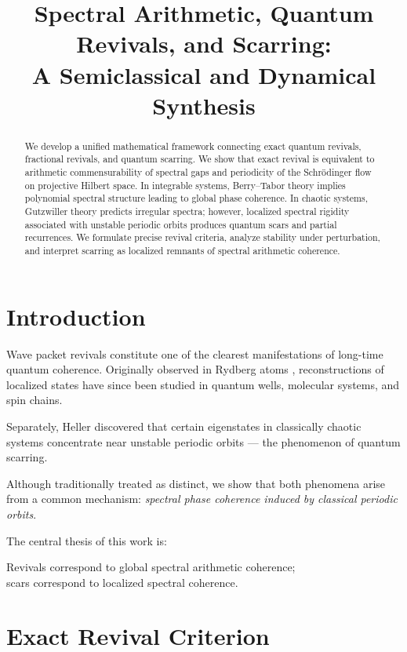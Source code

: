 \documentclass[11pt]{article}
\title{Spectral Arithmetic, Quantum Revivals, and Scarring:\\
A Semiclassical and Dynamical Synthesis}
\author{}
\date{}
\begin{document}
\maketitle

\begin{abstract}
We develop a unified mathematical framework connecting exact quantum revivals,
fractional revivals, and quantum scarring. 
We show that exact revival is equivalent to arithmetic commensurability of spectral gaps and periodicity of the Schr\"odinger flow on projective Hilbert space.
In integrable systems, Berry--Tabor theory implies polynomial spectral structure leading to global phase coherence.
In chaotic systems, Gutzwiller theory predicts irregular spectra; however, localized spectral rigidity associated with unstable periodic orbits produces quantum scars and partial recurrences.
We formulate precise revival criteria, analyze stability under perturbation,
and interpret scarring as localized remnants of spectral arithmetic coherence.
\end{abstract}

\tableofcontents

\section{Introduction}

Wave packet revivals constitute one of the clearest manifestations of long-time quantum coherence.
Originally observed in Rydberg atoms \cite{Eberly1980},
reconstructions of localized states have since been studied in quantum wells, molecular systems, and spin chains.

Separately, Heller \cite{Heller1984} discovered that certain eigenstates in classically chaotic systems concentrate near unstable periodic orbits — the phenomenon of quantum scarring.

Although traditionally treated as distinct,
we show that both phenomena arise from a common mechanism:
\emph{spectral phase coherence induced by classical periodic orbits}.

The central thesis of this work is:

\begin{center}
Revivals correspond to global spectral arithmetic coherence;\\
scars correspond to localized spectral coherence.
\end{center}

\section{Exact Revival Criterion}
\end{document}
